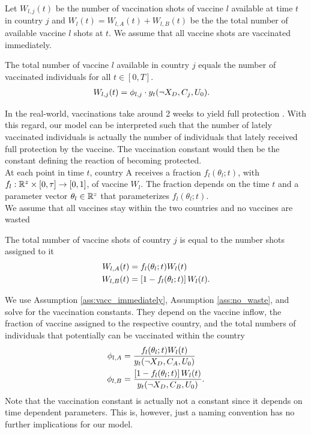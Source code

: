 Let $W_{l,j}(t)$ be the number of vaccination shots of vaccine $l$ available at time $t$ in country $j$ and $W_l(t) = W_{l,A}(t) + W_{l,B}(t)$ be the the total number of available vaccine $l$ shots at $t$. We assume that all vaccine shots are vaccinated immediately.
\begin{assumption}
\label{ass:vacc_immediately}
The total number of vaccine $l$ available in country $j$ equals the number of vaccinated individuals for all $t \in [0, T]$. 
\begin{align}
\label{eq:vaccine_country}
W_{l,j}(t) &= \phi_{l, j} \cdot y_t(\neg X_D, C_j, U_0)  . 
\end{align}
\end{assumption}
\noindent In the real-world, vaccinations take around 2 weeks to yield full protection \citep{cdc.2021}. With this regard, our model can be interpreted such that the number of lately vaccinated individuals is actually the number of individuals that lately received full protection by the vaccine. The vaccination constant would then be the constant defining the reaction of becoming protected. \\

At each point in time $t$, country A receives a fraction $f_{l}(\theta_l; t)$, with $f_{l}: \mathbb{R}^{z} \times [0, \tau] \to [0,1]$, of vaccine $W_l$. The fraction depends on the time $t$ and a parameter vector $\theta_l \in \mathbb{R}^{z}$ that parameterizes $f_{l}(\theta_l; t)$.\\

We assume that all vaccines stay within the two countries and no vaccines are wasted
\begin{assumption}
\label{ass:no_waste}
The total number of vaccine shots of country $j$ is equal to the number shots assigned to it
\begin{align}
\label{eq:vaccine_frac}
W_{l,A}(t) &= f_{l}(\theta_l; t) W_l(t) \\
W_{l,B}(t) &= \left[1 - f_{l}(\theta_l; t)\right] W_l(t) \notag.
\end{align}
\end{assumption}
\noindent We use Assumption \ref{ass:vacc_immediately}, Assumption \ref{ass:no_waste}, and solve for the vaccination constants. They depend on the vaccine inflow, the fraction of vaccine assigned to the respective country, and the total numbers of individuals that potentially can be vaccinated within the country
\begin{align*}
\phi_{l,A} &= \frac{ f_{l}(\theta_l; t) W_{l}(t)}{y_t(\neg X_D, C_A, U_0) } \notag \\
\phi_{l,B} &= \frac{\left[1 - f_{l}(\theta_l; t)\right]  W_{l}(t)}{y_t(\neg X_D, C_B, U_0)}.
\end{align*}
Note that the vaccination constant is actually not a constant since it depends on time dependent parameters. This is, however, just a naming convention has no further implications for our model.

